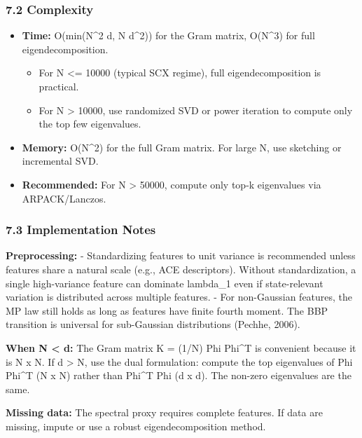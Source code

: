 \documentclass[
  12pt,
]{article}
\providecommand{\tightlist}{%
  \setlength{\itemsep}{0pt}\setlength{\parskip}{0pt}}
\begin{document}
\subsubsection{7.2 Complexity}\label{complexity}

\begin{itemize}
\tightlist
\item
  \textbf{Time:} O(min(N\^{}2 d, N d\^{}2)) for the Gram matrix,
  O(N\^{}3) for full eigendecomposition.

  \begin{itemize}
  \tightlist
  \item
    For N \textless= 10000 (typical SCX regime), full eigendecomposition
    is practical.
  \item
    For N \textgreater{} 10000, use randomized SVD or power iteration to
    compute only the top few eigenvalues.
  \end{itemize}
\item
  \textbf{Memory:} O(N\^{}2) for the full Gram matrix. For large N, use
  sketching or incremental SVD.
\item
  \textbf{Recommended:} For N \textgreater{} 50000, compute only top-k
  eigenvalues via ARPACK/Lanczos.
\end{itemize}

\subsubsection{7.3 Implementation Notes}\label{implementation-notes}

\textbf{Preprocessing:} - Standardizing features to unit variance is
recommended unless features share a natural scale (e.g., ACE
descriptors). Without standardization, a single high-variance feature
can dominate lambda\_1 even if state-relevant variation is distributed
across multiple features. - For non-Gaussian features, the MP law still
holds as long as features have finite fourth moment. The BBP transition
is universal for sub-Gaussian distributions (Pechhe, 2006).

\textbf{When N \textless{} d:} The Gram matrix K = (1/N) Phi Phi\^{}T is
convenient because it is N x N. If d \textgreater{} N, use the dual
formulation: compute the top eigenvalues of Phi Phi\^{}T (N x N) rather
than Phi\^{}T Phi (d x d). The non-zero eigenvalues are the same.

\textbf{Missing data:} The spectral proxy requires complete features. If
data are missing, impute or use a robust eigendecomposition method.
\end{document}
